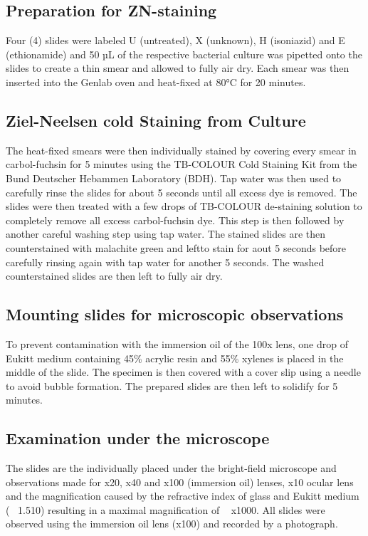 {\subsection{Preparation for ZN-staining}
Four (4) slides were labeled U (untreated), X (unknown), H (isoniazid) and E (ethionamide) and 50 µL of the respective bacterial culture was pipetted onto the slides to create a thin smear and allowed to fully air dry. Each smear was then inserted into the Genlab oven and heat-fixed at 80°C for 20 minutes.

\subsection{Ziel-Neelsen cold Staining from Culture}
The heat-fixed smears were then individually stained by covering every smear in carbol-fuchsin for 5 minutes using the TB-COLOUR Cold Staining Kit from the Bund Deutscher Hebammen Laboratory (BDH). Tap water was then used to carefully rinse the slides  for about 5 seconds until all excess dye is removed. The slides were then treated with a few drops of TB-COLOUR de-staining solution to completely remove all excess carbol-fuchsin dye. This step is then followed by another careful washing step using tap water. The stained slides are then counterstained with malachite green and leftto stain for aout 5 seconds before carefully rinsing again with tap water for another 5 seconds. The washed counterstained slides are then left to fully air dry.

\subsection{Mounting slides for microscopic observations}
To prevent contamination with the immersion oil of the 100x lens, one drop of Eukitt medium containing 45\% acrylic resin and 55\% xylenes is placed in the middle of the slide. The specimen is then covered with a cover slip using a needle to avoid bubble formation. The prepared slides are then left to solidify for 5 minutes.

\subsection{Examination under the microscope}
The slides are the individually placed under the bright-field microscope and observations made for x20, x40 and x100 (immersion oil) lenses, x10 ocular lens and the magnification caused by the refractive index of glass and Eukitt medium (~ 1.510) resulting in a maximal magnification of ~ x1000. All slides were observed using the immersion oil lens (x100) and recorded by a photograph. 

}
\endinput